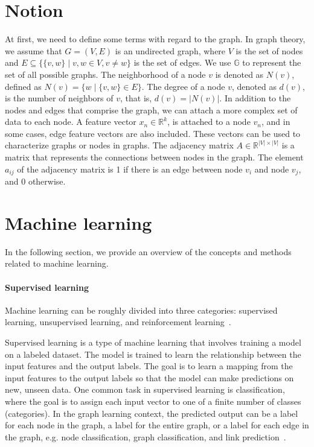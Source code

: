 \section{Notion}
At first, we need to define some terms with regard to the graph. In graph theory, we assume that $G=(V,E)$ is an undirected graph, where $V$ is the set of nodes and $E  \subseteq \{\{v,w\}\mid v,w \in V , v \neq w\}$ is the set of edges. We use $\mathbb{G}$ to represent the set of all possible graphs. The neighborhood of a node $v$ is denoted as $N(v)$, defined as $N(v) = \{w \mid \{v,w\} \in E\}$. The degree of a node $v$, denoted as $d(v)$, is the number of neighbors of $v$, that is, $d(v) = |N(v)|$. In addition to the nodes and edges that comprise the graph, we can attach a more complex set of data to each node.  A feature vector $x_n\in \mathbb{R}^k$, is attached to a node $v_n$, and in some cases, edge feature vectors are also included. These vectors can be used to characterize graphs or nodes in graphs. The adjacency matrix $A \in \mathbb{R}^{|V| \times |V|}$ is a matrix that represents the connections between nodes in the graph. The element $a_{ij}$ of the adjacency matrix is 1 if there is an edge between node $v_i$ and node $v_j$, and 0 otherwise.

\section{Machine learning}
In the following section, we provide an overview of the concepts and methods related to machine learning. 

\paragraph{Supervised learning}
Machine learning can be roughly divided into three categories: supervised learning, unsupervised learning, and reinforcement learning~\cite{bishop2006pattern}.

Supervised learning is a type of machine learning that involves training a model on a labeled dataset. The model is trained to learn the relationship between the input features and the output labels. The goal is to learn a mapping from the input features to the output labels so that the model can make predictions on new, unseen data. One common task in supervised learning is classification, where the goal is to assign each input vector to one of a finite number of classes (categories). In the graph learning context, the predicted output can be a label for each node in the graph, a label for the entire graph, or a label for each edge in the graph, e.g. node classification, graph classification, and link prediction~\cite{velivckovic2023everything}.

